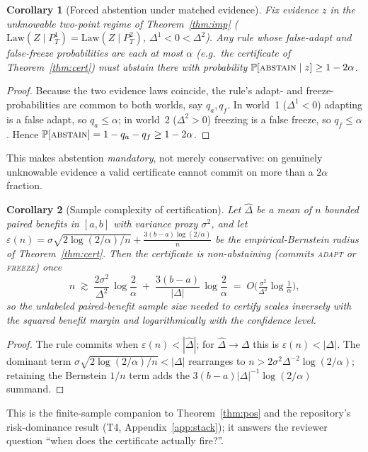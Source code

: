 \documentclass[conference]{IEEEtran}
\theoremstyle{plain}
\newtheorem{corollary}{Corollary}
\theoremstyle{definition}
\renewcommand{\Pr}{\mathbb{P}}
\newcommand{\Law}{\mathrm{Law}}
\begin{document}
\begin{corollary}[Forced abstention under matched evidence]\label{cor:forced-abstain}
Fix evidence $z$ in the unknowable two-point regime of Theorem~\ref{thm:imp}
($\Law(Z\mid P_T^1)=\Law(Z\mid P_T^2)$, $\Delta^1<0<\Delta^2$). Any rule whose
false-adapt and false-freeze probabilities are each at most $\alpha$ (e.g.\ the
certificate of Theorem~\ref{thm:cert}) must abstain there with probability
$\Pr[\textsc{abstain}\mid z]\ge 1-2\alpha$.
\end{corollary}
\begin{proof}
Because the two evidence laws coincide, the rule's adapt- and freeze-probabilities are
common to both worlds, say $q_a,q_f$. In world~1 ($\Delta^1<0$) adapting is a false
adapt, so $q_a\le\alpha$; in world~2 ($\Delta^2>0$) freezing is a false freeze, so
$q_f\le\alpha$. Hence $\Pr[\textsc{abstain}]=1-q_a-q_f\ge1-2\alpha$. \qedhere
\end{proof}
\noindent This makes abstention \emph{mandatory}, not merely conservative: on genuinely
unknowable evidence a valid certificate cannot commit on more than a $2\alpha$ fraction.

\begin{corollary}[Sample complexity of certification]\label{cor:samplecomp}
Let $\widehat\Delta$ be a mean of $n$ bounded paired benefits in $[a,b]$ with variance
proxy $\sigma^2$, and let $\varepsilon(n)=\sigma\sqrt{2\log(2/\alpha)/n}+\tfrac{3(b-a)\log(2/\alpha)}{n}$
be the empirical-Bernstein radius of Theorem~\ref{thm:cert}. Then the certificate is
non-abstaining (commits \textsc{adapt} or \textsc{freeze}) once
\[
n\;\gtrsim\;\frac{2\sigma^2}{\Delta^2}\,\log\frac{2}{\alpha}\;+\;\frac{3(b-a)}{|\Delta|}\,\log\frac{2}{\alpha}
\;=\;O\!\Big(\tfrac{\sigma^2}{\Delta^2}\log\tfrac1\alpha\Big),
\]
so the unlabeled paired-benefit sample size needed to certify scales inversely with the
squared benefit margin and logarithmically with the confidence level.
\end{corollary}
\begin{proof}
The rule commits when $\varepsilon(n)<|\widehat\Delta|$; for $\widehat\Delta\to\Delta$
this is $\varepsilon(n)<|\Delta|$. The dominant term $\sigma\sqrt{2\log(2/\alpha)/n}<|\Delta|$
rearranges to $n>2\sigma^2\Delta^{-2}\log(2/\alpha)$; retaining the Bernstein $1/n$ term
adds the $3(b-a)|\Delta|^{-1}\log(2/\alpha)$ summand. \qedhere
\end{proof}
\noindent This is the finite-sample companion to Theorem~\ref{thm:pos} and the
repository's risk-dominance result (T4, Appendix~\ref{app:stack}); it answers the
reviewer question ``when does the certificate actually fire?''.
\end{document}
